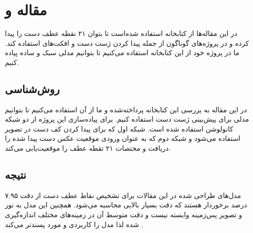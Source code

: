 \section{مقاله  و }
در این مقاله‌ها از کتابخانه  استفاده‌ شده‌است تا بتوان ۲۱ نقطه عطف دست را پیدا کرده و در پروژه‌های گوناگون از جمله پیدا کردن ژست دست و افکت‌های  استفاده کند. ما در پروژه خود از این کتابخانه استفاده می‌کنیم تا بتوانیم مدلی سبک و ساده پیاده کنیم.

\subsection{روش‌شناسی}
 در این مقاله به یررسی این کتابخانه پرداخته‌شده و ما از آن استفاده می‌کنیم تا بتوانیم مدلی برای پیش‌بینی ژست دست استفاده کنیم.
برای پیاده‌سازی این پروژه از دو شبکه کانولوشن استفاده شده است. شبکه اول که برای پیدا کردن کف دست در تصویر استفاده می‌شود و شبکه دوم که به عنوان ورودی موقعیت عکس دست پیدا شده را دریافت و مختصات ۲۱ تقطه عطف را موقعیت‌یابی می‌کند.






\subsection{نتیجه}
مدل‌های طراحی شده در این مقالات برای تشخیص نقاط عطف دست از دقت ۷.۹۵ درصد برخوردار هستند که دقت بسیار بالایی محاسبه می‌شود. همچنین این مدل به نور و تصویر پس‌زمینه وابسته نیست و دقت متوسط آن در زمینه‌های مختلف اندازه‌گیری شده لذا مدل را کاربردی‌ و مورد پسندتر می‌کند\cite{zhang2020mediapipe} .
